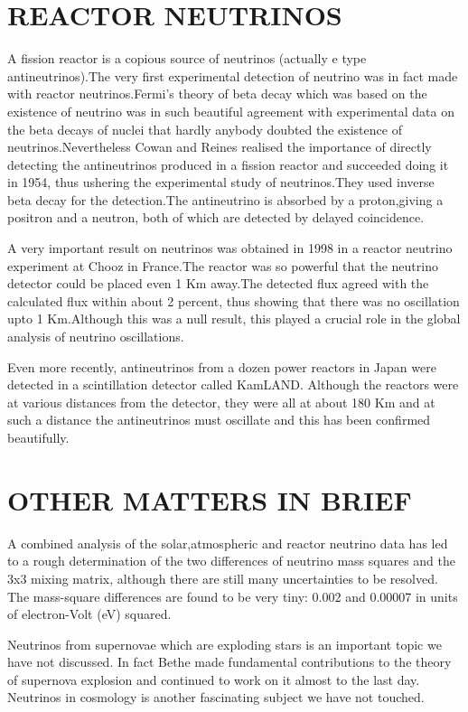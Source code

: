 \section{REACTOR NEUTRINOS}

A fission reactor is a copious source of neutrinos (actually
e type antineutrinos).The very first experimental detection
of neutrino was in fact made with reactor neutrinos.Fermi's
theory of beta decay which was based on the existence of
neutrino was in such beautiful agreement with experimental
data on the beta decays of nuclei that hardly anybody doubted
the existence of neutrinos.Nevertheless Cowan and Reines
realised the importance of directly detecting the antineutrinos
produced in a fission reactor and succeeded doing it in 1954,
thus ushering the experimental study of neutrinos.They
used inverse beta decay for the detection.The antineutrino
is absorbed by a proton,giving a positron and a neutron, both
of which are detected by delayed coincidence.

A very important result on neutrinos was obtained in 1998 in a 
reactor neutrino experiment at Chooz in France.The reactor
was so powerful that the neutrino detector could be placed
even 1 Km away.The detected flux agreed with the calculated 
flux within about 2 percent, thus showing that there was
no oscillation upto 1 Km.Although this was a null result,
this played a crucial role in the global analysis of neutrino
oscillations.

Even more recently, antineutrinos from a dozen power reactors
in Japan were detected in a scintillation detector called
KamLAND. Although the reactors were at various distances
from the detector, they were all at about 180 Km and at
such a distance the antineutrinos must oscillate and this
has been confirmed beautifully.

\section{OTHER MATTERS IN BRIEF}

A combined analysis of the solar,atmospheric and reactor neutrino
data has led to a rough determination of the two differences of
neutrino mass squares and the 3x3 mixing matrix, although there
are still many uncertainties to be resolved. The mass-square
differences are found to be very tiny: 0.002 and 0.00007 in units
of electron-Volt (eV) squared.

Neutrinos from supernovae which are exploding stars is an important
topic we have not discussed. In fact Bethe made fundamental
contributions to the theory of supernova explosion and continued
to work on it almost to the last day. Neutrinos in cosmology is
another fascinating subject we have not touched.

